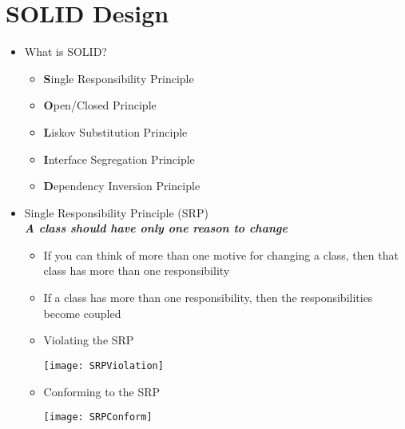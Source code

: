 
\usepackage{wrapfig}

\section{SOLID Design}

\begin{itemize}
	\item What is SOLID?
	\begin{itemize}
		\item \textbf{S}ingle Responsibility Principle
		\item \textbf{O}pen/Closed Principle
		\item \textbf{L}iskov Substitution Principle
		\item \textbf{I}nterface Segregation Principle
		\item \textbf{D}ependency Inversion Principle
	\end{itemize}

	\item Single Responsibility Principle (SRP)\\
	\textbf{\emph{A class should have only one reason to change}}
	\begin{itemize}
		\item If you can think of more than one motive for changing a class, then that class has more than one responsibility
		\item If a class has more than one responsibility, then the responsibilities become coupled
		\item Violating the SRP\\
		\begin{center}
			\texttt{[image: SRPViolation]}
		\end{center}
		\item Conforming to the SRP
		\begin{center}
			\texttt{[image: SRPConform]}
		\end{center}
	\end{itemize}


\end{itemize}

